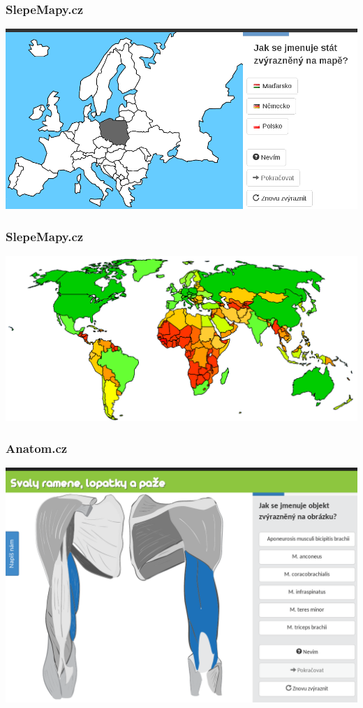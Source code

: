 \documentclass[xcolor=svgnames]{beamer}
\begin{document}
\begin{frame}
	\frametitle{SlepeMapy.cz}
   \includegraphics[width=\textwidth]{img/practice-example-cs}
\end{frame}
\begin{frame}
	\frametitle{SlepeMapy.cz}
   \includegraphics[width=\textwidth]{img/knowledge-map}
\end{frame}
\begin{frame}
	\frametitle{Anatom.cz}
   \includegraphics[width=\textwidth]{img/anatom-practice-cs}
\end{frame}
\end{document}
